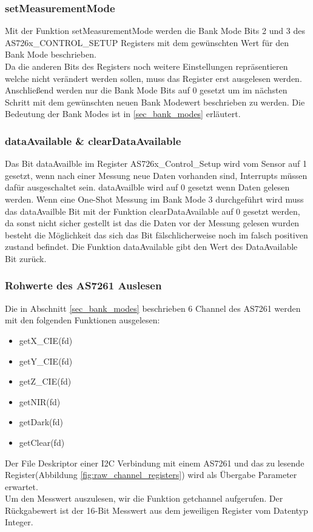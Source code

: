 \subsubsection{setMeasurementMode}
Mit der Funktion setMeasurementMode werden die Bank Mode Bits 2 und 3 des \\
AS726x\_CONTROL\_SETUP Registers mit dem gewünschten Wert für den Bank Mode beschrieben.\\
Da die anderen Bits des Registers noch weitere Einstellungen repräsentieren welche nicht verändert werden sollen, muss das Register erst ausgelesen werden.
Anschließend werden nur die Bank Mode Bits auf 0 gesetzt um im nächsten Schritt mit dem gewünschten neuen Bank Modewert beschrieben zu werden. 
Die Bedeutung der Bank Modes ist in \ref{sec_bank_modes} erläutert.

\subsubsection{dataAvailable \& clearDataAvailable}
Das Bit dataAvailble im Register AS726x\_Control\_Setup wird vom Sensor auf 1 gesetzt, wenn nach einer Messung neue Daten vorhanden sind, Interrupts müssen dafür ausgeschaltet sein.
dataAvailble wird auf 0 gesetzt wenn Daten gelesen werden.
Wenn eine One-Shot Messung im Bank Mode 3 durchgeführt wird muss das dataAvailble Bit mit der Funktion clearDataAvailable auf 0 gesetzt werden, da sonst nicht sicher gestellt ist das die Daten vor der Messung gelesen wurden besteht die Möglichkeit das sich das Bit fälschlicherweise noch im falsch positiven zustand befindet.
Die Funktion dataAvailable gibt den Wert des DataAvailable Bit zurück.\\

%

\subsubsection{Rohwerte des AS7261 Auslesen}
Die in Abschnitt \ref{sec_bank_modes} beschrieben 6 Channel des AS7261 werden mit den folgenden Funktionen ausgelesen:
\begin{itemize}
	\item getX\_CIE(fd)
	\item getY\_CIE(fd)
	\item getZ\_CIE(fd)
	\item getNIR(fd)
	\item getDark(fd) 
	\item getClear(fd)
\end{itemize}
Der File Deskriptor einer I2C Verbindung mit einem AS7261 und das zu lesende Register(Abbildung \ref{fig:raw_channel_registers}) wird als Übergabe Parameter erwartet.\\
Um den Messwert auszulesen, wir die Funktion getchannel aufgerufen.
Der Rückgabewert ist der 16-Bit Messwert aus dem jeweiligen Register vom Datentyp Integer.


